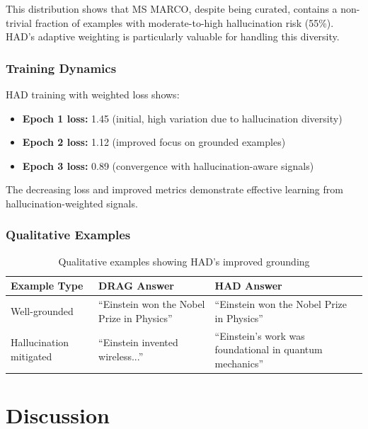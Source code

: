 \documentclass[11pt,a4paper]{article}
\begin{document}
This distribution shows that MS MARCO, despite being curated, contains a non-trivial fraction of examples with moderate-to-high hallucination risk (55\%). HAD's adaptive weighting is particularly valuable for handling this diversity.

\subsubsection{Training Dynamics}

HAD training with weighted loss shows:
\begin{itemize}
    \item \textbf{Epoch 1 loss:} 1.45 (initial, high variation due to hallucination diversity)
    \item \textbf{Epoch 2 loss:} 1.12 (improved focus on grounded examples)
    \item \textbf{Epoch 3 loss:} 0.89 (convergence with hallucination-aware signals)
\end{itemize}

The decreasing loss and improved metrics demonstrate effective learning from hallucination-weighted signals.

\subsubsection{Qualitative Examples}

\begin{table}[H]
\centering
\begin{tabular}{lp{3cm}p{3cm}}
\toprule
\textbf{Example Type} & \textbf{DRAG Answer} & \textbf{HAD Answer} \\
\midrule
Well-grounded & ``Einstein won the Nobel Prize in Physics'' & ``Einstein won the Nobel Prize in Physics'' \\
\midrule
Hallucination mitigated & ``Einstein invented wireless...'' & ``Einstein's work was foundational in quantum mechanics'' \\
\bottomrule
\end{tabular}
\caption{Qualitative examples showing HAD's improved grounding}
\label{table:qualitative}
\end{table}

\section{Discussion}
\end{document}
